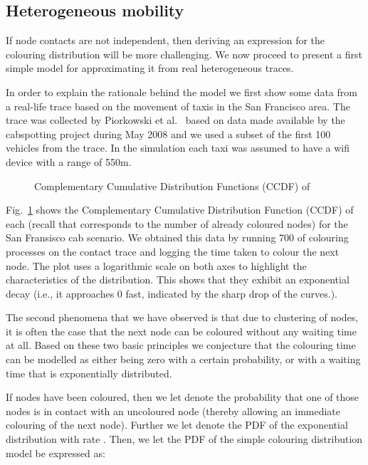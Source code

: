\documentclass{article}
\begin{document}
\subsection{Heterogeneous mobility}
\label{sec:heterogeneous}

If node contacts are not independent, then deriving an expression for
the colouring distribution  will be more challenging. We
now proceed to present a first simple model for approximating it
from real heterogeneous traces.

In order to explain the rationale behind the model we  first show
some data from a real-life trace based on the movement of taxis in the
San Francisco area. The trace was collected by Piorkowski et
al.~\cite{piorkowski09} based on data made available by the
cabspotting project during May 2008 and we used a subset of the first
100 vehicles from the trace. In the simulation each taxi was assumed
to have a wifi device with a range of 550m.


\begin{figure}[tb]
  \centering
   \caption{Complementary Cumulative Distribution Functions (CCDF) of
     }
  \label{fig:ccdf}
\end{figure}

Fig.~\ref{fig:ccdf} shows the Complementary Cumulative Distribution
Function (CCDF) of each  (recall that  corresponds to the
number of already coloured nodes) for the San Fransisco cab
scenario. We obtained this data by running 700 of colouring processes
on the contact trace and logging the time taken to colour the next
node. The plot uses a logarithmic scale on both axes to highlight the
characteristics of the distribution. This shows that they exhibit an
exponential decay (i.e., it approaches 0 fast, indicated by the sharp
drop of the curves.).

The second phenomena that we have observed is that due to clustering
of nodes, it is often the case that the next node can be coloured
without any waiting time at all. Based on these two basic principles
we conjecture that the colouring time can be modelled as either being
zero with a certain probability, or with a waiting time that is
exponentially distributed.

If  nodes have been coloured, then we let  denote the
probability that one of those  nodes is in contact with an uncoloured
node (thereby allowing an immediate colouring of the next
node). Further we let  denote the PDF of
the exponential distribution with rate . Then, we let the
PDF of the simple colouring distribution model be expressed as:
\end{document}
